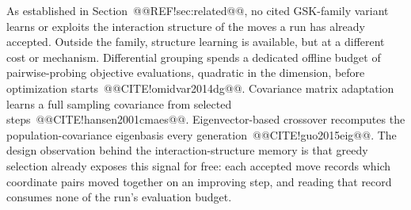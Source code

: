 \documentclass[10pt,a4paper]{article}
\begin{document}
As established in Section~@@REF!sec:related@@, no cited GSK-family variant
learns or exploits the interaction structure of the moves a run has
already accepted.
Outside the family, structure learning is available, but at a different
cost or mechanism. Differential grouping spends a dedicated offline
budget of pairwise-probing objective evaluations, quadratic in the
dimension, before optimization starts~@@CITE!omidvar2014dg@@. Covariance
matrix adaptation learns a full sampling covariance from selected
steps~@@CITE!hansen2001cmaes@@. Eigenvector-based crossover
recomputes the population-covariance eigenbasis every
generation~@@CITE!guo2015eig@@. 
The design observation behind the interaction-structure memory is that greedy
selection already exposes this signal for free: each accepted move
records which coordinate pairs moved together on an improving step, and
reading that record consumes none of the run's evaluation budget.
\end{document}
